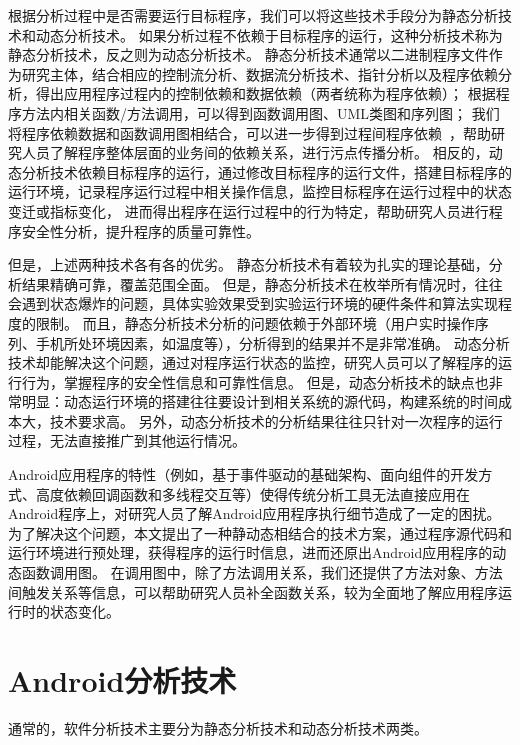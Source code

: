根据分析过程中是否需要运行目标程序，我们可以将这些技术手段分为静态分析技术和动态分析技术。
如果分析过程不依赖于目标程序的运行，这种分析技术称为静态分析技术，反之则为动态分析技术。
静态分析技术通常以二进制程序文件作为研究主体，结合相应的控制流分析、数据流分析技术、指针分析以及程序依赖分析，得出应用程序过程内的控制依赖和数据依赖（两者统称为程序依赖）；
根据程序方法内相关函数/方法调用，可以得到函数调用图、UML类图和序列图；
我们将程序依赖数据和函数调用图相结合，可以进一步得到过程间程序依赖~\cite{stafford2000formal}，帮助研究人员了解程序整体层面的业务间的依赖关系，进行污点传播分析。
相反的，动态分析技术依赖目标程序的运行，通过修改目标程序的运行文件，搭建目标程序的运行环境，记录程序运行过程中相关操作信息，监控目标程序在运行过程中的状态变迁或指标变化，
进而得出程序在运行过程中的行为特定，帮助研究人员进行程序安全性分析，提升程序的质量可靠性。

但是，上述两种技术各有各的优劣。
静态分析技术有着较为扎实的理论基础，分析结果精确可靠，覆盖范围全面。
但是，静态分析技术在枚举所有情况时，往往会遇到状态爆炸的问题，具体实验效果受到实验运行环境的硬件条件和算法实现程度的限制。
而且，静态分析技术分析的问题依赖于外部环境（用户实时操作序列、手机所处环境因素，如温度等），分析得到的结果并不是非常准确。
动态分析技术却能解决这个问题，通过对程序运行状态的监控，研究人员可以了解程序的运行行为，掌握程序的安全性信息和可靠性信息。
但是，动态分析技术的缺点也非常明显：动态运行环境的搭建往往要设计到相关系统的源代码，构建系统的时间成本大，技术要求高。
另外，动态分析技术的分析结果往往只针对一次程序的运行过程，无法直接推广到其他运行情况。

Android应用程序的特性（例如，基于事件驱动的基础架构、面向组件的开发方式、高度依赖回调函数和多线程交互等）使得传统分析工具无法直接应用在Android程序上，对研究人员了解Android应用程序执行细节造成了一定的困扰。
为了解决这个问题，本文提出了一种静动态相结合的技术方案，通过程序源代码和运行环境进行预处理，获得程序的运行时信息，进而还原出Android应用程序的动态函数调用图。
在调用图中，除了方法调用关系，我们还提供了方法对象、方法间触发关系等信息，可以帮助研究人员补全函数关系，较为全面地了解应用程序运行时的状态变化。




\section{Android分析技术}

通常的，软件分析技术主要分为静态分析技术和动态分析技术两类。


